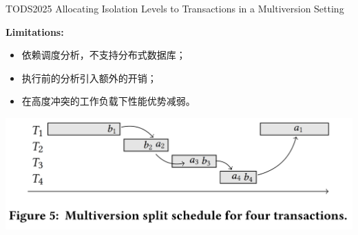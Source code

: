 \begin{frame}{TODS2025 Allocating Isolation Levels to Transactions in a Multiversion Setting}

	\textbf{Limitations: }
	\begin{itemize}
		\item 依赖调度分析，不支持分布式数据库；
		\item 执行前的分析引入额外的开销；
		\item 在高度冲突的工作负载下性能优势减弱。
	\end{itemize}

	\begin{center}
		\includegraphics[width=0.8\linewidth]{figs/split-sche}
	\end{center}
\end{frame}

